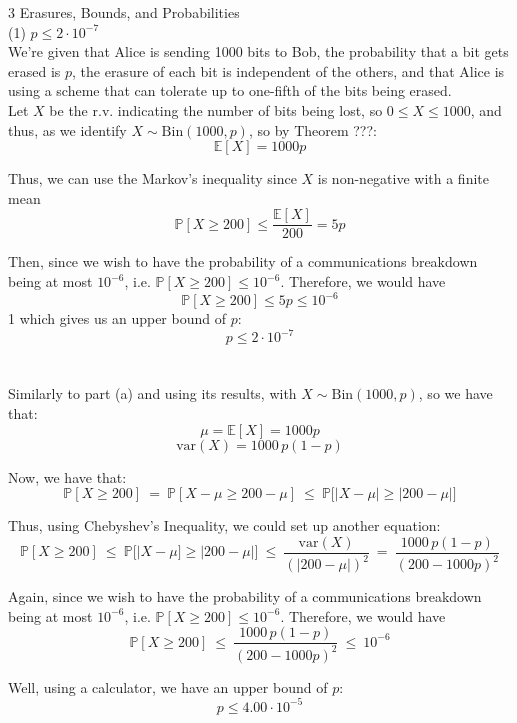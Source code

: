 \documentclass{article}
\begin{document}
{\Large 3 Erasures, Bounds, and Probabilities} \\[.5cm]
{\color{red} (1)
$p \leq 2\cdot 10^{-7}$ } \\

We're given that Alice is sending 1000 bits to Bob,
the probability that a bit gets erased is $p$,
the erasure of each bit is independent of the others, and that
Alice is using a scheme that can tolerate up to one-fifth of the bits being erased. \\

Let $X$ be the r.v. indicating the number of bits being lost, so $0\leq X\leq 1000$, and thus, as we identify $X\sim\text{Bin}(1000,p)$, so by Theorem ???:
$$\mathbb{E}[X] = 1000p$$

Thus, we can use the Markov's inequality since $X$ is non-negative with a finite mean
$$\mathbb{P}[X\geq200] \leq \frac{\mathbb{E}[X]}{200} = 5p$$

Then, since we wish to have the probability of a communications breakdown being at most $10^{-6}$, i.e. $\mathbb{P}[X\geq200] \leq 10^{-6}$. Therefore, we would have
$$\mathbb{P}[X\geq200] \leq 5p \leq 10^{-6}$$
1
which gives us an upper bound of $p$:
$$p \leq 2\cdot 10^{-7} $$ \\



 \\

Similarly to part (a) and using its results, with $X\sim\text{Bin}(1000,p)$, so we have that:
$$\mu = \mathbb{E}[X] = 1000p$$
$$\text{var}(X) = 1000\,p(1-p)$$

Now, we have that:
$$\mathbb{P}[X \geq 200]\ =\
\mathbb{P}[X-\mu \geq 200-\mu]\ \leq\
\mathbb{P}\big[|X-\mu| \geq |200-\mu|\big] $$

Thus, using Chebyshev's Inequality, we could set up another equation:
$$\mathbb{P}[X \geq 200]\ \leq\
\mathbb{P}\big[|X-\mu] \geq |200-\mu|\big]\ \leq\
	\frac{\text{var}(X)}{(|200-\mu|)^2}\ =\
\frac{1000\,p(1-p)}{(200-1000p)^2} $$

Again, since we wish to have the probability of a communications breakdown being at most $10^{-6}$, i.e. $\mathbb{P}[X\geq200] \leq 10^{-6}$. Therefore, we would have
$$\mathbb{P}[X \geq 200]\ \leq\
\frac{1000\,p(1-p)}{(200-1000p)^2}\ \leq\
10^{-6}$$

Well, using a calculator, we have an upper bound of $p$:
$$ p \leq 4.00 \cdot 10^{-5} $$ \\
\end{document}
